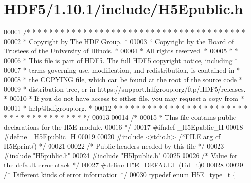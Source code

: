 \hypertarget{_h_d_f5_21_810_81_2include_2_h5_epublic_8h_source}{}\section{H\+D\+F5/1.10.1/include/\+H5\+Epublic.h}
\label{_h_d_f5_21_810_81_2include_2_h5_epublic_8h_source}

\begin{DoxyCode}
00001 \textcolor{comment}{/* * * * * * * * * * * * * * * * * * * * * * * * * * * * * * * * * * * * * * *}
00002 \textcolor{comment}{ * Copyright by The HDF Group.                                               *}
00003 \textcolor{comment}{ * Copyright by the Board of Trustees of the University of Illinois.         *}
00004 \textcolor{comment}{ * All rights reserved.                                                      *}
00005 \textcolor{comment}{ *                                                                           *}
00006 \textcolor{comment}{ * This file is part of HDF5.  The full HDF5 copyright notice, including     *}
00007 \textcolor{comment}{ * terms governing use, modification, and redistribution, is contained in    *}
00008 \textcolor{comment}{ * the COPYING file, which can be found at the root of the source code       *}
00009 \textcolor{comment}{ * distribution tree, or in https://support.hdfgroup.org/ftp/HDF5/releases.  *}
00010 \textcolor{comment}{ * If you do not have access to either file, you may request a copy from     *}
00011 \textcolor{comment}{ * help@hdfgroup.org.                                                        *}
00012 \textcolor{comment}{ * * * * * * * * * * * * * * * * * * * * * * * * * * * * * * * * * * * * * * */}
00013 
00014 \textcolor{comment}{/*}
00015 \textcolor{comment}{ * This file contains public declarations for the H5E module.}
00016 \textcolor{comment}{ */}
00017 \textcolor{preprocessor}{#ifndef \_H5Epublic\_H}
00018 \textcolor{preprocessor}{#define \_H5Epublic\_H}
00019 
00020 \textcolor{preprocessor}{#include <stdio.h>}              \textcolor{comment}{/*FILE arg of H5Eprint()                     */}
00021 
00022 \textcolor{comment}{/* Public headers needed by this file */}
00023 \textcolor{preprocessor}{#include "H5public.h"}
00024 \textcolor{preprocessor}{#include "H5Ipublic.h"}
00025 
00026 \textcolor{comment}{/* Value for the default error stack */}
00027 \textcolor{preprocessor}{#define H5E\_DEFAULT             (hid\_t)0}
00028 
00029 \textcolor{comment}{/* Different kinds of error information */}
00030 \textcolor{keyword}{typedef} \textcolor{keyword}{enum} H5E\_type\_t \{

\end{DoxyCode}
